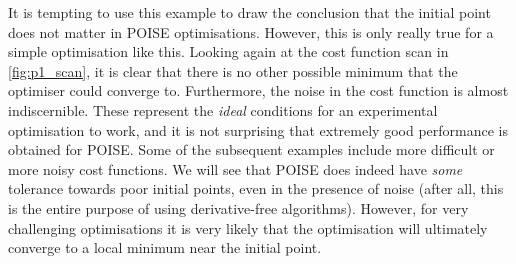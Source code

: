 It is tempting to use this example to draw the conclusion that the initial point does not matter in POISE optimisations.
However, this is only really true for a simple optimisation like this.
Looking again at the cost function scan in \cref{fig:p1_scan}, it is clear that there is no other possible minimum that the optimiser could converge to.
Furthermore, the noise in the cost function is almost indiscernible.
These represent the \textit{ideal} conditions for an experimental optimisation to work, and it is not surprising that extremely good performance is obtained for POISE.
Some of the subsequent examples include more difficult or more noisy cost functions.
We will see that POISE does indeed have \textit{some} tolerance towards poor initial points, even in the presence of noise (after all, this is the entire purpose of using derivative-free algorithms).
However, for very challenging optimisations it is very likely that the optimisation will ultimately converge to a local minimum near the initial point.
